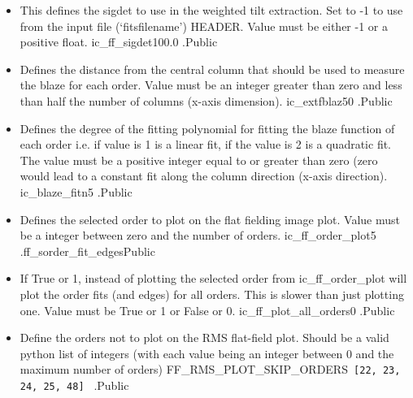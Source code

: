 \begin{itemize}
\item {}
{This defines the sigdet to use in the weighted tilt extraction. Set to -1 to use from the input file (`fitsfilename') HEADER. Value must be either -1 or a positive float.}
{ic\_ff\_sigdet}{100.0}
{\calFFraw}{\constantsfile}{\calFFraw.\progMAIN}{Public}


\item {}
{Defines the distance from the central column that should be used to measure the blaze for each order. Value must be an integer greater than zero and less than half the number of columns (x-axis dimension).}
{ic\_extfblaz}{50}
{\calFFraw}{\constantsfile}{\calFFraw.\progMAIN}{Public}


\item {}
{Defines the degree of the fitting polynomial for fitting the blaze function of each order i.e. if value is 1 is a linear fit, if the value is 2 is a quadratic fit. The value must be a positive integer equal to or greater than zero (zero would lead to a constant fit along the column direction (x-axis direction).}
{ic\_blaze\_fitn}{5}
{\calFFraw}{\constantsfile}{\calFFraw.\progMAIN}{Public}


\item {}
{Defines the selected order to plot on the flat fielding image plot. Value must be a integer between zero and the number of orders.}
{ic\_ff\_order\_plot}{5}
{\calFFraw}{\constantsfile}{\spirouPlot.ff\_sorder\_fit\_edges}{Public}

\item {}
{If True or 1, instead of plotting the selected order from ic\_ff\_order\_plot will plot the order fits (and edges) for all orders. This is slower than just plotting one. Value must be True or 1 or False or 0.}
{ic\_ff\_plot\_all\_orders}{0}
{\calFFraw}{\constantsfile}{\calFFraw.\progMAIN}{Public}

\item {} 
{Define the orders not to plot on the RMS flat-field plot. Should be a valid python list of integers (with each value being an integer between 0 and the maximum number of orders)}
{FF\_RMS\_PLOT\_SKIP\_ORDERS}{{\lstinline[style=pythoninline]| [22, 23, 24, 25, 48] |}}
{\calFFraw}{\constantsfile}{\spirouPlot.}{Public}


\end{itemize}
